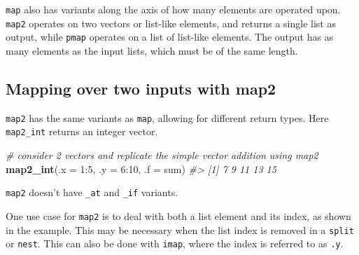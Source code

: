 \documentclass[]{book}
\newenvironment{Shaded}{}{}
\newcommand{\CommentTok}[1]{\textcolor[rgb]{0.38,0.63,0.69}{\textit{#1}}}
\newcommand{\ControlFlowTok}[1]{\textcolor[rgb]{0.00,0.44,0.13}{\textbf{#1}}}
\newcommand{\DataTypeTok}[1]{\textcolor[rgb]{0.56,0.13,0.00}{#1}}
\newcommand{\DecValTok}[1]{\textcolor[rgb]{0.25,0.63,0.44}{#1}}
\newcommand{\KeywordTok}[1]{\textcolor[rgb]{0.00,0.44,0.13}{\textbf{#1}}}
\newcommand{\NormalTok}[1]{#1}
\newcommand{\OperatorTok}[1]{\textcolor[rgb]{0.40,0.40,0.40}{#1}}
\newcommand{\StringTok}[1]{\textcolor[rgb]{0.25,0.44,0.63}{#1}}
\begin{document}
\texttt{map} also has variants along the axis of how many elements are operated upon. \texttt{map2} operates on two vectors or list-like elements, and returns a single list as output, while \texttt{pmap} operates on a list of list-like elements.
The output has as many elements as the input lists, which must be of the same length.

\hypertarget{mapping-over-two-inputs-with-map2}{%
\subsection{Mapping over two inputs with map2}\label{mapping-over-two-inputs-with-map2}}

\texttt{map2} has the same variants as \texttt{map}, allowing for different return types.
Here \texttt{map2\_int} returns an integer vector.

\begin{Shaded}
\begin{Highlighting}[]
\CommentTok{# consider 2 vectors and replicate the simple vector addition using map2}
\KeywordTok{map2_int}\NormalTok{(}\DataTypeTok{.x =} \DecValTok{1}\OperatorTok{:}\DecValTok{5}\NormalTok{, }
         \DataTypeTok{.y =} \DecValTok{6}\OperatorTok{:}\DecValTok{10}\NormalTok{,}
         \DataTypeTok{.f =}\NormalTok{ sum)}
\CommentTok{#> [1]  7  9 11 13 15}
\end{Highlighting}
\end{Shaded}

\texttt{map2} doesn't have \texttt{\_at} and \texttt{\_if} variants.

One use case for \texttt{map2} is to deal with both a list element and its index, as shown in the example. This may be necessary when the list index is removed in a \texttt{split} or \texttt{nest}. This can also be done with \texttt{imap}, where the index is referred to as \texttt{.y}.

\begin{Shaded}
\end{Shaded}
\end{document}
